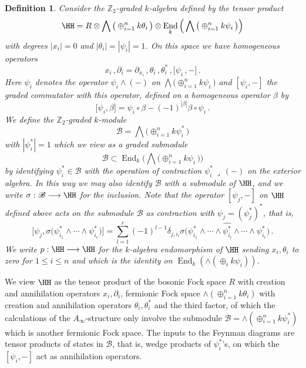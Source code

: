 \documentclass[english,letter paper,12pt,leqno]{article}
\theoremstyle{example}
\newtheorem{definition}[theorem]{Definition}
\numberwithin{equation}{section}
\def\be{\begin{equation}}
\def\ee{\end{equation}}
\def\nZ{\mathds{Z}}
\DeclareMathOperator{\End}{End}
\begin{document}
\begin{definition}\label{defn:handop} Consider the $\nZ_2$-graded $k$-algebra defined by the tensor product
\be
\HH = R \otimes \bigwedge\big( \oplus_{i=1}^n k \theta_i \,\big) \otimes \End_k\Big( \bigwedge\big( \oplus_{i=1}^n k \psi_i \, \big) \Big)
\ee
with degrees $|x_i| = 0$ and $|\theta_i| = |\psi_i| = 1$. On this space we have homogeneous operators
\be
x_i\,, \partial_i = \partial_{x_i}\,, \theta_i\,, \theta_i^*\,, \big[\psi_i\,,-\big]\,.
\ee
Here $\psi_i$ denotes the operator $\psi_i \wedge (-)$ on $\bigwedge\big( \oplus_{i=1}^n k \psi_i \, \big)$ and $[ \psi_i, - ]$ the graded commutator with this operator, defined on a homogeneous operator $\beta$ by
\[
\big[ \psi_i, \beta \big] = \psi_i \circ \beta - (-1)^{|\beta|} \beta \circ \psi_i\,.
\]
We define the $\nZ_2$-graded $k$-module
\be\label{defn:B}
\mathscr{B} = \bigwedge\big( \oplus_{i=1}^n k \psi_i^* \,\big)
\ee
with $|\psi_i^*| = 1$ which we view as a graded submodule
\[
\mathscr{B} \subset \End_k\Big( \bigwedge\big( \oplus_{i=1}^n k \psi_i \, \big) \Big)
\]
by identifying $\psi_i^* \in \mathscr{B}$ with the operation of contraction $\psi_i^*\, \lrcorner\, (-)$ on the exterior algebra. In this way we may also identify $\mathscr{B}$ with a submodule of $\HH$, and we write $\sigma: \mathscr{B} \lto \HH$ for the inclusion. Note that the operator $[\psi_j, -]$ on $\HH$ defined above acts on the submodule $\mathscr{B}$ as contraction with $\psi_j = (\psi_j^*)^*$, that is,
\be\label{eq:comm_is_ann}
\Big[ \psi_j, \sigma\big(\psi_{i_1}^* \wedge \cdots \wedge \psi_{i_r}^*\big) \Big] = \sum_{l=1}^r (-1)^{l-1} \delta_{j, i_l} \sigma\big(\psi_{i_1}^* \wedge \cdots \wedge \widehat{ \psi_{i_l}^* } \wedge \cdots \wedge \psi_{i_r}^*\big)\,.
\ee
We write $p: \HH \lto \HH$ for the $k$-algebra endomorphism of $\HH$ sending $x_i, \theta_i$ to zero for $1 \le i \le n$ and which is the identity on $\End_k( \wedge( \oplus_i k\psi_i ) )$.
\end{definition}

We view $\HH$ as the tensor product of the bosonic Fock space $R$ with creation and annihilation operators $x_i, \partial_i$, fermionic Fock space $\wedge( \oplus_{i=1}^n k \theta_i )$ with creation and annihilation operators $\theta_i, \theta_i^*$ and the third factor, of which the calculations of the $A_\infty$-structure only involve the submodule $\mathscr{B} = \wedge( \oplus_{i=1}^n k \psi_i^* )$ which is another fermionic Fock space. The inputs to the Feynman diagrams are tensor products of states in $\mathscr{B}$, that is, wedge products of $\psi_i^*$'s, on which the $[\psi_i, -]$ act as annihilation operators.
\end{document}
